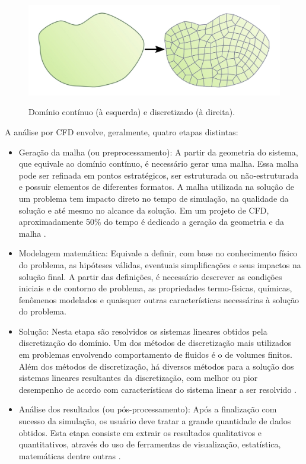 \begin{figure}[htb]
  \caption[Domínio contínuo e discretizado.]{Domínio contínuo (à esquerda) e discretizado (à direita).}
  \centering\includegraphics[scale=1.3]{figuras/dom.png}
  \label{fig:dom}
\end{figure}

A análise por CFD envolve, geralmente, quatro etapas distintas:

\begin{itemize}
\item Geração da malha (ou preprocessamento): A partir da geometria do sistema, que equivale ao
  domínio contínuo, é necessário gerar uma malha. Essa malha pode ser refinada
  em pontos estratégicos, ser estruturada ou não-estruturada e possuir elementos
  de diferentes formatos. A malha utilizada na solução de um problema tem impacto
  direto no tempo de simulação, na qualidade da solução e até mesmo no alcance
  da solução. Em um projeto de CFD, aproximadamente 50\% do tempo é dedicado a geração
  da geometria e da malha \cite{Versteeg2007}.
\item Modelagem matemática: Equivale a definir, com base no conhecimento
  físico do problema, as hipóteses válidas, eventuais simplificações e
  seus impactos na solução final. A partir das definições, é necessário
  descrever as condições iniciais e de contorno de problema, as propriedades
  termo-físicas, químicas, fenômenos modelados e quaisquer outras características
  necessárias à solução do problema.
\item Solução: Nesta etapa são resolvidos os sistemas lineares obtidos pela
  discretização do domínio. Um dos métodos de discretização mais utilizados
  em problemas envolvendo comportamento de fluidos é o de volumes finitos. Além dos
  métodos de discretização, há diversos métodos para a solução dos sistemas
  lineares resultantes da discretização, com melhor ou pior desempenho de
  acordo com características do sistema linear a ser resolvido \cite{Barrett1994}.
\item Análise dos resultados (ou pós-processamento): Após a finalização
  com sucesso da simulação, os usuário deve tratar a grande quantidade de
  dados obtidos. Esta etapa consiste em extrair os resultados qualitativos
  e quantitativos, através do uso de ferramentas de visualização, estatística,
  matemáticas dentre outras \cite{Maric2014}.
\end{itemize}

